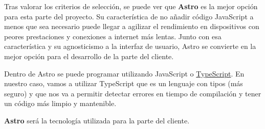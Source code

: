 Tras valorar los criterios de selección, se puede ver que \textbf{Astro} es la mejor opción para esta parte del proyecto. Su característica de no añadir código JavaScript a menos que sea necesario puede llegar a agilizar el rendimiento en dispositivos con peores prestaciones y conexiones a internet más lentas. Junto con esa característica y su agnosticismo a la interfaz de usuario, Astro se convierte en la mejor opción para el desarrollo de la parte del cliente.

Dentro de Astro se puede programar utilizando JavaScript o \href{https://www.typescriptlang.org/}{TypeScript}. En nuestro caso, vamos a utilizar TypeScript que es un lenguaje con tipos (más seguro) y que nos va a permitir detectar errores en tiempo de compilación y tener un código más limpio y mantenible.

\textbf{Astro} será la tecnología utilizada para la parte del cliente.